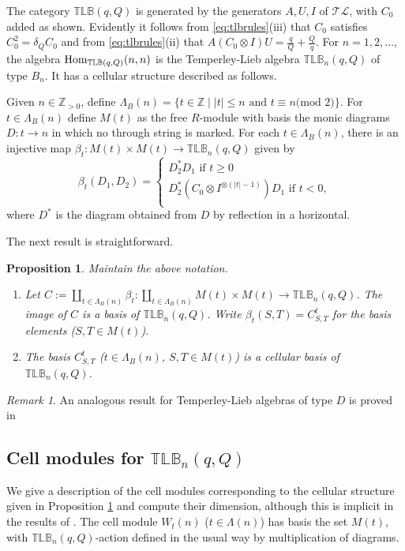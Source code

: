 \documentclass[12pt]{amsart}
\newtheorem{proposition}[theorem]{Proposition}
\theoremstyle{definition}
\theoremstyle{remark}
\newtheorem{remark}[theorem]{Remark}
\numberwithin{equation}{section}
\newcommand{\Z}{{\mathbb Z}}
\newcommand{\be}{\begin{equation}}
\newcommand{\ee}{\end{equation}}
\newcommand{\lr}{\longrightarrow}
\newcommand{\Hom}{{\rm{Hom}}}
\newcommand{\ot}{\otimes}
\newcommand{\TLC}{\mathcal{TL}}
\newcommand{\TLBB}{{\mathbb{TLB}}}
\begin{document}
The category $\TLBB(q,Q)$ is generated by the generators $A,U,I$ of $\TLC$, with $C_0$ added as shown. Evidently 
it follows from \eqref{eq:tlbrules}(iii) that $C_0$ satisfies $C_0^2=\delta_Q C_0$ 
and from \eqref{eq:tlbrules}(ii) that $A(C_0\ot I)U=\frac{q}{Q}+\frac{Q}{q}$. For $n=1,2,\dots$, the algebra $\Hom_{\TLBB(q,Q)}(n,n)$
is the Temperley-Lieb algebra $\TLBB_n(q,Q)$ of type $B_n$. It has a cellular structure described as follows. 

Given $n\in\Z_{>0}$, define $\Lambda_B(n)=\{t\in\Z\mid |t|\leq n\text{ and }t\equiv n\text{(mod }2)\}$. For $t\in\Lambda_B(n)$
define $M(t)$ as the free $R$-module with basis the monic diagrams $D:t\lr n$ in which no through string is marked. 
For each $t\in\Lambda_B (n)$, there is an injective map $\beta_t:M(t)\times M(t)\lr \TLBB_n(q,Q)$ given by 
\be\label{eq:cell}
\beta_t(D_1,D_2)=
\begin{cases}
D_2^*D_1\text{ if }t\geq 0\\
D_2^*(C_0\ot I^{\ot(|t|-1)})D_1\text{ if }t<0,\\
\end{cases}
\ee
where $D^*$ is the diagram obtained from $D$ by reflection in a horizontal.

The next result is straightforward.

\begin{proposition}\label{prop:tlbcell}
Maintain the above notation.
\begin{enumerate}
\item Let $C:=\amalg_{t\in\Lambda_B(n)}\beta_t:\amalg_{t\in\Lambda_B(n)}M(t)\times M(t)\lr \TLBB_n(q,Q)$. The image 
of $C$ is a basis of $\TLBB_n(q,Q)$. Write $\beta_t(S,T)=C_{S,T}^t$ for the basis elements ($S,T\in M(t)$).
\item The basis $C^t_{S,T}$ ($t\in\Lambda_B(n)$, $S,T\in M(t)$) is a cellular basis of $\TLBB_n(q,Q)$.
\end{enumerate}
\end{proposition}

\begin{remark}
An analogous result for Temperley-Lieb algebras of type $D$ is proved in \cite{LS}
\end{remark}

\subsection{Cell modules for $\TLBB_n(q,Q)$} We give a description of the cell modules corresponding to the cellular structure
given in Proposition \ref{prop:tlbcell} and compute their dimension, although this is implicit in the results of \cite{GL03}.
The cell module $W_t(n)$  ($t\in\Lambda(n)$) has basis the set $M(t)$, with $\TLBB_n(q,Q)$-action defined in the usual way
by multiplication of diagrams.
\end{document}
